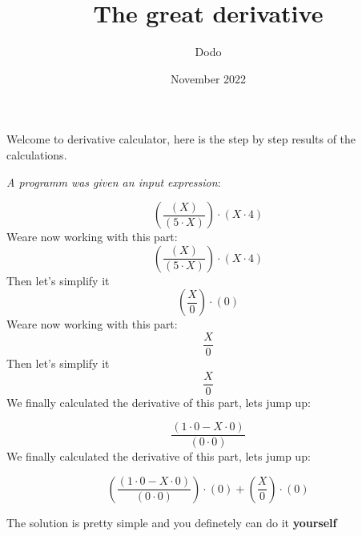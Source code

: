 \documentclass{article}
\title{The great derivative}
\author{Dodo}
\date{November 2022}
\begin{document}
    \maketitle
    
        Welcome to derivative calculator, here is the
        step by step results of the calculations.

        \textit{A programm was given an input expression}:

    
\begin{equation}
{({\frac{({X})}{({{5}\cdot{X}})}})\cdot({{X}\cdot{4}})}
\end{equation}
Weare now working with this part:\\
\begin{equation}
{({\frac{({X})}{({{5}\cdot{X}})}})\cdot({{X}\cdot{4}})}
\end{equation}
Then let's simplify it\\
\begin{equation}
{({\frac{{X}}{{0}}})\cdot({0})}
\end{equation}
Weare now working with this part:\\
\begin{equation}
{\frac{{X}}{{0}}}
\end{equation}
Then let's simplify it\\
\begin{equation}
{\frac{{X}}{{0}}}
\end{equation}
We finally calculated the derivative of this part, lets jump up:

\begin{equation}
{\frac{({{{1}\cdot{0}}-{{X}\cdot{0}}})}{({{0}\cdot{0}})}}
\end{equation}
We finally calculated the derivative of this part, lets jump up:

\begin{equation}
{{({\frac{({{{1}\cdot{0}}-{{X}\cdot{0}}})}{({{0}\cdot{0}})}})\cdot({0})}+{({\frac{{X}}{{0}}})\cdot({0})}}
\end{equation}

        The solution is pretty simple and you definetely can do it \textbf{yourself}
        
\end{document}
